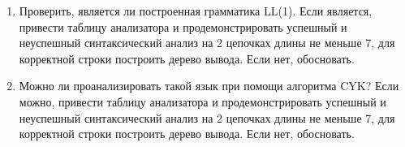 \documentclass[12pt]{article}
\begin{document}
\begin{enumerate}
  \item Проверить, является ли построенная грамматика LL(1). Если является, привести таблицу анализатора и продемонстрировать успешный и неуспешный синтаксический анализ на 2 цепочках длины не меньше 7, для корректной строки построить дерево вывода. Если нет, обосновать.

  \item Можно ли проанализировать такой язык при помощи алгоритма CYK? Если можно, привести таблицу анализатора и продемонстрировать успешный и неуспешный синтаксический анализ на 2 цепочках длины не меньше 7, для корректной строки построить дерево вывода. Если нет, обосновать.

\end{enumerate}
\end{document}
